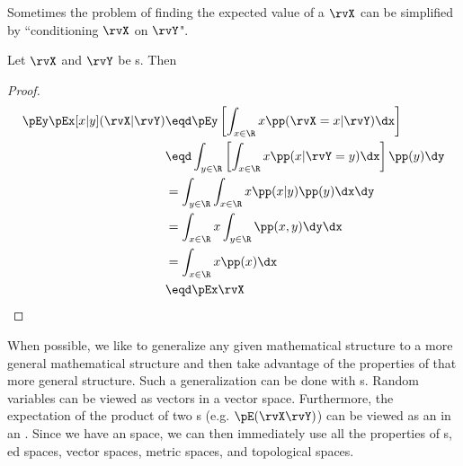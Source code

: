 Sometimes the problem of finding the expected value of a  $\rvX$
can be simplified by ``conditioning $\rvX$ on $\rvY$".
\begin{theorem}
Let $\rvX$ and $\rvY$ be s. Then
\thmbox{\pEx{\rvX} = \pEy\pEx[x|y](\rvX|\rvY) }
\end{theorem}
\begin{proof}
\begin{align*}
   \pEy\pEx[x|y](\rvX|\rvY)
     &\eqd \pEy \left[ \int_{x\in\R}x \pp(\rvX=x|\rvY) \dx \right]
   \\&\eqd \int_{y\in\R} \left[\int_{x\in\R}x \pp(x|\rvY=y) \dx \right] \pp(y) \dy
   \\&=    \int_{y\in\R} \int_{x\in\R}x \pp(x|y)\pp(y) \dx   \dy
   \\&=    \int_{x\in\R}x \int_{y\in\R} \pp(x,y) \dy   \dx
   \\&=    \int_{x\in\R}x \pp(x) \dx
   \\&\eqd \pEx\rvX
\end{align*}
\end{proof}

When possible, we like to generalize any given mathematical structure
to a more general mathematical structure and then take advantage of
the properties of that more general structure.
Such a generalization can be done with s.
Random variables can be viewed as vectors in a vector space.
Furthermore, the expectation of the product of two s
(e.g. $\pE(\rvX\rvY)$)
can be viewed as an  in an .
Since we have an  space,
we can then immediately use all the properties of
s, ed spaces, vector spaces, metric spaces,
and topological spaces.

